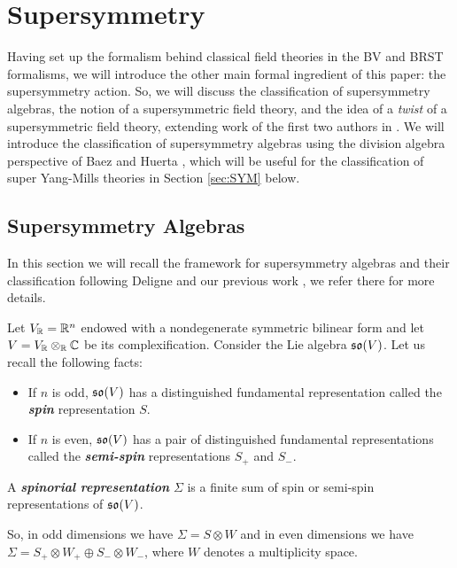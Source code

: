 \documentclass[10pt, oneside]{article}
\newcommand{\defterm}[1]{\textbf{\emph{#1}}}
\begin{document}
\section{Supersymmetry} \label{sec: susy}
Having set up the formalism behind classical field theories in the BV and BRST formalisms, we will introduce the other main formal ingredient of this paper: the supersymmetry action.  So, we will discuss the classification of supersymmetry algebras, the notion of a supersymmetric field theory, and the idea of a \emph{twist} of a supersymmetric field theory, extending work of the first two authors in \cite{ElliottSafronov}.  We will introduce the classification of supersymmetry algebras using the division algebra perspective of Baez and Huerta \cite{BaezHuerta}, which will be useful for the classification of super Yang-Mills theories in Section \ref{sec:SYM} below.

\subsection{Supersymmetry Algebras} \label{sec:susyalgebras}
In this section we will recall the framework for supersymmetry algebras and their classification following Deligne \cite{DeligneSpinors} and our previous work \cite{ElliottSafronov}, we refer there for more details.

Let $V_\mathbb R = \mathbb R^n$ endowed with a nondegenerate symmetric bilinear form and let $V=V_\mathbb R\otimes_\mathbb R\mathbb C$ be its complexification. Consider the Lie algebra $\mathfrak{so}(V)$. Let us recall the following facts:
\begin{itemize}
\item If $n$ is odd, $\mathfrak{so}(V)$ has a distinguished fundamental representation called the \defterm{spin} representation $S$.

\item If $n$ is even, $\mathfrak{so}(V)$ has a pair of distinguished fundamental representations called the \defterm{semi-spin} representations $S_+$ and $S_-$.
\end{itemize}

\begin{definition}
A \defterm{spinorial representation} $\Sigma$ is a finite sum of spin or semi-spin representations of $\mathfrak{so}(V)$.
\end{definition}

So, in odd dimensions we have $\Sigma=S\otimes W$ and in even dimensions we have $\Sigma=S_+\otimes W_+\oplus S_-\otimes W_-$, where $W$ denotes a multiplicity space.
\end{document}
